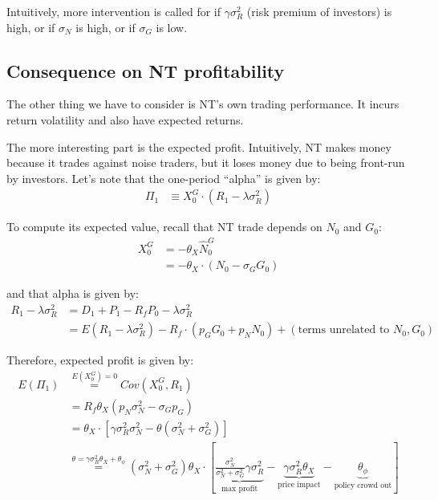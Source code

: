 \documentclass[12pt]{article}
\begin{document}
Intuitively, more intervention is called for if $\gamma \sigma_R^2$ (risk premium of investors) is high, or if $\sigma_N$ is high, or if $\sigma_G$ is low. 

\subsection{Consequence on NT profitability}
The other thing we have to consider is NT's own trading performance. It incurs return volatility and also have expected returns. 

The more interesting part is the expected profit. Intuitively, NT makes money because it trades against noise traders, but it loses money due to being front-run by investors. Let's note that the one-period ``alpha'' is given by:
\begin{align*}
    \Pi_1 & \equiv X_0^G \cdot (R_1 - \lambda \sigma_R^2)
\end{align*}

To compute its expected value, recall that NT trade depends on $N_0$ and $G_0$:
\begin{align*}
    X_0^G & = - \theta_X \hat{N}_0^G \\
    & = - \theta_X \cdot (N_0 - \sigma_G G_0)
\end{align*}

\noindent and that alpha is given by:
\begin{align*}
    R_1 - \lambda \sigma_R^2 & = D_1 + P_1 - R_f P_0 - \lambda \sigma_R^2 \\
    & = E(R_1 - \lambda \sigma_R^2) - R_f \cdot (p_G G_0 + p_N N_0) + (\text{terms unrelated to } N_0, G_0)
\end{align*}

Therefore, expected profit is given by:
\begin{align*}
E(\Pi_1) & \stackrel{E(X_0^G) = 0}{=} Cov(X_0^G, R_1) \\
& = R_f \theta_X (p_N \sigma_N^2 - \sigma_G p_G) \\
& = \theta_X \cdot [\gamma \sigma_R^2 \sigma_N^2 - \theta (\sigma_N^2 + \sigma_G^2)] \\
& \stackrel{\theta = \gamma \sigma_R^2 \theta_X + \theta_\phi}{=} (\sigma_N^2 + \sigma_G^2) \theta_X \cdot \left[ \underbrace{\frac{\sigma_N^2}{\sigma_N^2 + \sigma_G^2} \gamma \sigma_R^2}_\text{max profit} - \underbrace{\gamma \sigma_R^2 \theta_X}_\text{price impact}  - \underbrace{\theta_\phi}_\text{policy crowd out} \right]
\end{align*}
\end{document}
